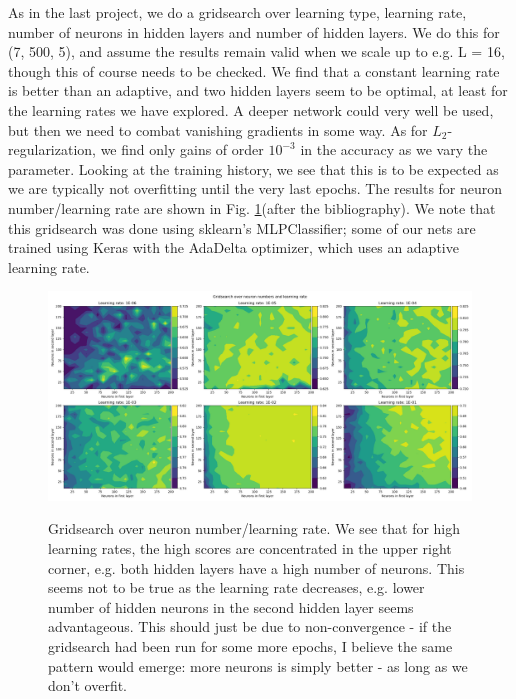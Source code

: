 \documentclass[]{article}
\begin{document}
As in the last project, we do a gridsearch over learning type, learning rate, number of neurons in hidden layers and number of hidden layers. We do this for (7, 500, 5), and assume the results remain valid when we scale up to e.g. L = 16, though this of course needs to be checked. We find that a constant learning rate is better than an adaptive, and two hidden layers seem to be optimal, at least for the learning rates we have explored. A deeper network could very well be used, but then we need to combat vanishing gradients in some way. As for $L_2$-regularization, we find only gains of order $10^{-3}$ in the accuracy as we vary the parameter. Looking at the training history, we see that this is to be expected as we are typically not overfitting until the very last epochs. The results for neuron number/learning rate are shown in Fig. \ref{fig:neuralnet_75005_gsv}(after the bibliography). We note that this gridsearch was done using sklearn's MLPClassifier; some of our nets are trained using Keras with the AdaDelta optimizer, which uses an adaptive learning rate. 

\begin{figure}[h]
	\hspace{-120px}
	\includegraphics[width=600px]{../Plots/nn_gridsearch_neurons_lr.png}
	\label{fig:neuralnet_75005_gsv}
	\caption{Gridsearch over neuron number/learning rate. We see that for high learning rates, the high scores are concentrated in the upper right corner, e.g. both hidden layers have a high number of neurons. This seems not to be true as the learning rate decreases, e.g. lower number of hidden neurons in the second hidden layer seems advantageous. This should just be due to non-convergence - if the gridsearch had been run for some more epochs, I believe the same pattern would emerge: more neurons is simply better - as long as we don't overfit.}
\end{figure}
\end{document}
